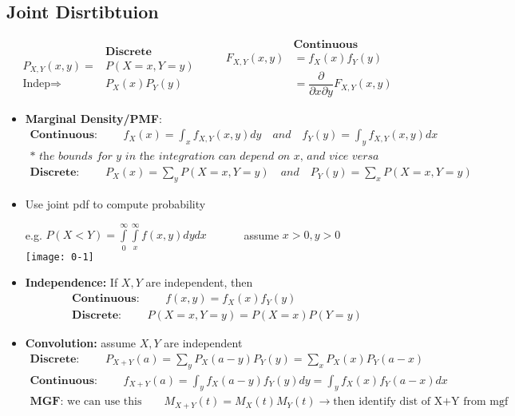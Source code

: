 \subsection*{Joint Disrtibtuion}
\begin{equation*}
	\begin{split}
		& \textbf{Discrete}\\
		P_{X,Y}(x,y) = & P(X=x, Y=y)\\
		\text{Indep} \Rightarrow & P_X(x)P_Y(y)
	\end{split}\quad \quad
	\begin{split}
		& \textbf{Continuous}\\
		F_{X,Y}(x,y) & = f_X(x) f_Y(y)\\
		& = \dfrac{\partial}{\partial x \partial y} F_{X,Y}(x,y)
	\end{split}
\end{equation*}
\begin{itemize}
	\item \textbf{Marginal Density/PMF}:
	\begin{gather*}
		\textbf{Continuous: }\quad \quad f_X(x) = \int_x f_{X,Y}(x,y)dy \quad \textit{and} \quad f_Y(y) = \int_y f_{X,Y}(x,y)dx\\
		\textit{* the bounds for y in the integration can depend on x, and vice versa}\\
		\textbf{Discrete: }\quad \quad P_X(x) = \sum\limits_y P(X=x,Y=y) \quad \textit{and} \quad P_Y(y) = \sum\limits_x P(X=x,Y=y) 
	\end{gather*}
	\item Use joint pdf to compute probability
	\begin{center}
		e.g. $P(X < Y) = \int\limits_0^\infty \int\limits_x^\infty f(x,y)dy dx \quad \quad \quad$ assume $x>0, y>0$\\
		\texttt{[image: 0-1]}
	\end{center}
	\item \textbf{Independence: } If $X,Y$ are independent, then 
	\begin{gather*}
		\textbf{Continuous: }\quad \quad f(x,y) = f_X(x)f_Y(y)\\
		\textbf{Discrete: }\quad \quad P(X=x, Y=y) = P(X=x) P(Y=y)
	\end{gather*}
	\item \textbf{Convolution: } assume $X,Y$ are independent
	\begin{gather*}
		\textbf{Discrete: }\quad \quad P_{X+Y}(a) = \sum\limits_y P_X(a-y)P_Y(y) = \sum\limits_x P_X(x)P_Y(a-x)\\
		\textbf{Continuous: }\quad \quad f_{X+Y}(a) = \int_y f_X(a-y)f_Y(y)dy = \int_y f_X(x)f_Y(a-x)dx\\
		\textbf{MGF: }\text{we can use this} \quad \quad M_{X+Y}(t) = M_X(t) M_Y(t) \longrightarrow \text{then identify dist of X+Y from mgf} 
	\end{gather*}
\end{itemize}
